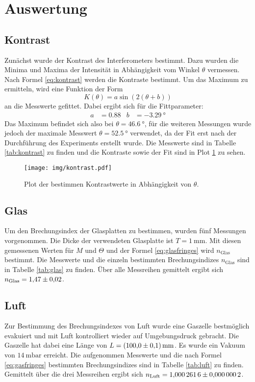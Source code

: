 \section{Auswertung}
\label{sec:Auswertung}


\subsection{Kontrast}

Zunächst wurde der Kontrast des Interferometers bestimmt. Dazu wurden die Minima und Maxima der Intensität in Abhängigkeit vom Winkel $\theta$ vermessen. Nach Formel \eqref{eq:kontrast} werden die Kontraste bestimmt.  Um das Maximum zu ermitteln, wird eine Funktion der Form
\begin{equation}
  K(\theta)=a\sin(2(\theta+b))
\end{equation}
an die Messwerte gefittet. Dabei ergibt sich für die Fittparameter:
\begin{align}
  a&=\num{0,88} & b&=\SI{-3,29}{°}
\end{align}
Das Maximum befindet sich also bei $\theta=\SI{46.6}{°}$, für die weiteren Messungen wurde jedoch der maximale Messwert $\theta=\SI{52.5}{°}$ verwendet, da der Fit erst nach der Durchführung des Experiments erstellt wurde.
Die Messwerte sind in Tabelle \ref{tab:kontrast} zu finden und die  Kontraste sowie der Fit sind in Plot \ref{img:kontrast} zu sehen.
\begin{figure}
  \centering
  \texttt{[image: img/kontrast.pdf]}
  \caption{Plot der bestimmen Kontrastwerte in Abhängigkeit von $\theta$.}
  \label{img:kontrast}
\end{figure}




\subsection{Glas}

Um den Brechungsindex der Glasplatten zu bestimmen, wurden fünf Messungen vorgenommen. Die Dicke der verwendeten Glasplatte ist $T=\SI{1}{\milli\meter}$\cite{V64}.
Mit diesen gemessenen Werten für $M$ und $\Theta$ und der Formel \eqref{eq:glasfringes} wird $n_\text{Glas}$ bestimmt. Die Messwerte und die einzeln bestimmten Brechungsindizes
 $n_\text{Glas}$ sind in Tabelle \ref{tab:glas} zu finden.
Über alle Messreihen gemittelt ergibt sich $n_\text{Glas}=\num{1,47\pm 0,02}$.




\subsection{Luft}

Zur Bestimmung des Brechungsindexes von Luft wurde eine Gaszelle bestmöglich evakuiert und mit Luft kontrolliert wieder auf Umgebungsdruck gebracht. Die Gaszelle hat dabei eine Länge von $L=\SI{100\pm 0.1}{\milli \meter}$. Es wurde ein
Vakuum von $\SI{14}{\milli \bar}$ erreicht. Die aufgenommen Messwerte und die nach Formel \eqref{eq:gasfringes} bestimmten Brechungsindizes sind in Tabelle \ref{tab:luft} zu finden.
Gemittelt über die drei Messreihen ergibt sich $n_\text{Luft}=\num{1.0002616 \pm 0.0000002}$.

